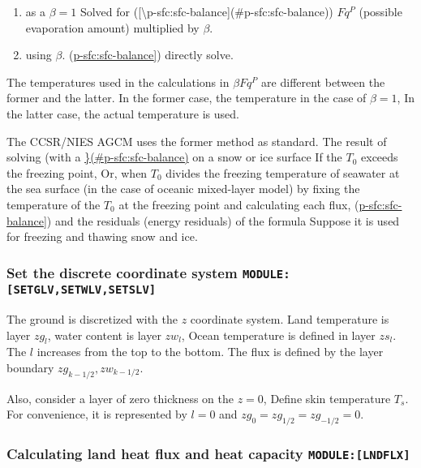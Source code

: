 \begin{enumerate}
\def\labelenumi{\arabic{enumi}.}
\item
  as a \(\beta=1\) Solved for
  ({[}\textbackslash p-sfc:sfc-balance{]}(\#p-sfc:sfc-balance)) \(Fq^P\)
  (possible evaporation amount) multiplied by \(\beta\).
\item
  using \(\beta\).
  (\protect\hyperlink{p-sfc:sfc-balance}{p-sfc:sfc-balance{]}}) directly
  solve.
\end{enumerate}

The temperatures used in the calculations in \(\beta Fq^P\) are
different between the former and the latter. In the former case, the
temperature in the case of \(\beta=1\), In the latter case, the actual
temperature is used.

The CCSR/NIES AGCM uses the former method as standard. The result of
solving (with a
\protect\hyperlink{p-sfc:sfc-balance}{\blind\blind\blind\blind\blind\blade\}(\#p-sfc:sfc-balance)}
on a snow or ice surface If the \(T_0\) exceeds the freezing point, Or,
when \(T_0\) divides the freezing temperature of seawater at the sea
surface (in the case of oceanic mixed-layer model) by fixing the
temperature of the \(T_0\) at the freezing point and calculating each
flux, (\protect\hyperlink{p-sfc:sfc-balance}{p-sfc:sfc-balance{]}}) and
the residuals (energy residuals) of the formula Suppose it is used for
freezing and thawing snow and ice.

\hypertarget{set-the-discrete-coordinate-system-modulesetglvsetwlvsetslv}{%
\subsubsection{\texorpdfstring{Set the discrete coordinate system
\texttt{MODULE:{[}SETGLV,SETWLV,SETSLV{]}}}{Set the discrete coordinate system MODULE:{[}SETGLV,SETWLV,SETSLV{]}}}\label{set-the-discrete-coordinate-system-modulesetglvsetwlvsetslv}}

The ground is discretized with the \(z\) coordinate system. Land
temperature is layer \(zg_l\), water content is layer \(zw_l\), Ocean
temperature is defined in layer \(zs_l\). The \(l\) increases from the
top to the bottom. The flux is defined by the layer boundary
\(zg_{k-1/2}, zw_{k-1/2}\).

Also, consider a layer of zero thickness on the \(z=0\), Define skin
temperature \(T_s\). For convenience, it is represented by \(l=0\) and
\(zg_{0} = zg_{1/2} = zg_{-1/2} = 0\).

\hypertarget{calculating-land-heat-flux-and-heat-capacity-modulelndflx}{%
\subsubsection{\texorpdfstring{Calculating land heat flux and heat
capacity
\texttt{MODULE:{[}LNDFLX{]}}}{Calculating land heat flux and heat capacity MODULE:{[}LNDFLX{]}}}\label{calculating-land-heat-flux-and-heat-capacity-modulelndflx}}

